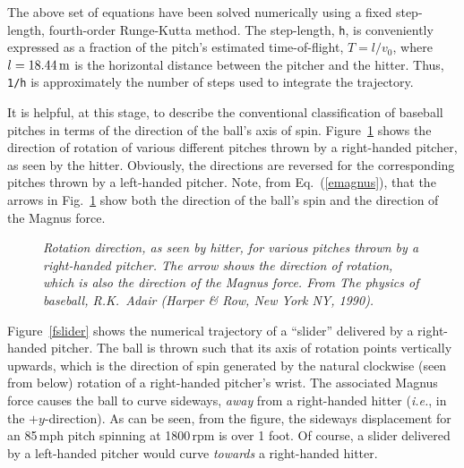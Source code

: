 The above set of equations have been solved numerically using a fixed step-length, fourth-order
Runge-Kutta method. The step-length, {\tt h}, is conveniently expressed as a fraction of the
pitch's  estimated
time-of-flight, $T = l/v_0$, where $l=18.44\,{\rm m}$ is the horizontal
distance between the pitcher and the hitter. Thus, {\tt 1/h} is approximately the number
of steps used to integrate the trajectory. 

It is helpful, at this stage, to describe the conventional classification of baseball
pitches in terms of the  direction of the ball's
axis of spin. Figure~\ref{fpitch} shows the direction of rotation of
various different pitches thrown by a right-handed
pitcher, as seen by the hitter. Obviously, the directions are reversed for the
corresponding pitches thrown by a left-handed pitcher. Note, from Eq.~(\ref{emagnus}),
that the arrows in Fig.~\ref{fpitch} show both the direction of the ball's spin and
the direction of the Magnus force. 

\begin{figure}
\epsfysize=2.25in
\centerline{}
\caption{\em Rotation direction, as seen by hitter, for various 
pitches thrown by a  right-handed pitcher. The arrow shows the direction of
rotation, which is also the direction of the Magnus force. From
{\em The physics of baseball}, R.K.~Adair (Harper \& Row, New York NY, 1990).}\label{fpitch}
\end{figure}

Figure~\ref{fslider} shows the numerical trajectory of a ``slider'' delivered
by a right-handed pitcher. The ball is thrown such that its axis
of rotation points vertically upwards, which is the direction of spin generated by
 the natural clockwise (seen from below) rotation of a right-handed pitcher's wrist.
The associated Magnus force causes the
ball to curve sideways, {\em away}\/ from a right-handed hitter ({\em i.e.}, in the
$+y$-direction). As can be seen, from the figure, the sideways displacement 
for an 85\,mph pitch spinning at
1800\,rpm  is over 1 foot. Of course, a slider delivered
by a left-handed pitcher would curve {\em towards}\/ a right-handed hitter.

